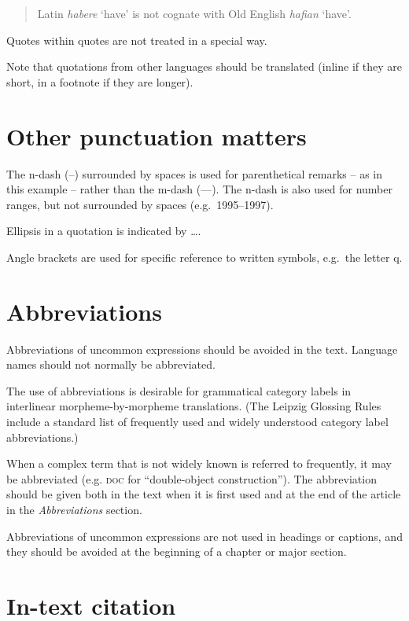 \documentclass[a4paper]{article}
\newenvironment{gsrexq}{\begin{quote}\color{blue}}{\end{quote}}
\newcommand{\gsrex}[1]{{\color{blue}#1}}
\begin{document}
\begin{gsrexq}
  Latin \textit{habere} `have' is not cognate with Old English \textit{hafian} `have'. 
\end{gsrexq}
Quotes within quotes are
not treated in a special way.

Note that quotations from other languages should be translated (inline
if they are short, in a footnote if they are longer).

\section{Other punctuation matters}\label{sec:other-punctuation-matters}

The n-dash (\gsrex{--}) surrounded by spaces is used for parenthetical remarks -- as in this example -- rather than the m-dash (\gsrex{---}). The n-dash is also used for number ranges, but not surrounded by spaces
(e.g.~\gsrex{1995--1997}).

Ellipsis in a quotation is indicated by \gsrex{\ldots}. 

Angle brackets are used for specific reference to
written symbols, e.g.~\gsrex{the letter \textlangle q\textrangle}.

\section{Abbreviations}\label{sec:abbreviations}

Abbreviations of uncommon expressions should be avoided in the text.
Language names should not normally be abbreviated. 

The use of abbreviations is desirable for grammatical category labels in
interlinear morpheme-by-morpheme translations. (The Leipzig Glossing
Rules include a standard list of frequently used and widely understood
category label abbreviations.) 

When a complex term that is not widely
known is referred to frequently, it may be abbreviated (e.g. \gsrex{\textsc{doc}} for
``double-object construction''). The abbreviation should be given both
in the text when it is first used and at the end of the article in the
\textit{Abbreviations} section. 

Abbreviations of uncommon expressions are not
used in headings or captions, and they should be avoided at the
beginning of a chapter or major section.

\section{In-text citation}\label{sec:in-text-citation}
\end{document}
